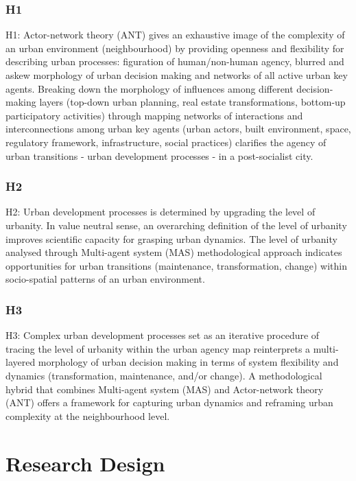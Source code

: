 \documentclass[11pt]{report}
\begin{document}
\subsubsection{H1}

H1: Actor-network theory (ANT) gives an exhaustive image of the complexity of an urban environment (neighbourhood) by providing openness and flexibility for describing urban processes: figuration of human/non-human agency, blurred and askew morphology of urban decision  making and networks of all active urban key agents.
Breaking  down  the morphology of influences among different decision-making layers (top-down urban planning, real estate transformations, bottom-up participatory activities) through mapping networks of interactions and interconnections among urban key agents (urban actors, built environment, space, regulatory framework, infrastructure, 
social practices) clarifies the agency of urban transitions - urban development processes - in a post-socialist city.

\subsubsection{H2}

H2:  Urban development processes  is  determined  by  upgrading the  level  of  urbanity.  In value neutral sense, an overarching definition of the level of urbanity improves scientific capacity for grasping urban dynamics. The level of urbanity analysed through Multi-agent system (MAS) methodological approach indicates opportunities for urban transitions (maintenance, transformation, change) within socio-spatial patterns of an urban environment. 

\subsubsection{H3}

H3: Complex urban development processes set as an iterative procedure of tracing the level of urbanity within the urban agency map reinterprets a multi-layered morphology of urban decision making in terms of system flexibility and dynamics (transformation, maintenance, and/or change). A methodological hybrid that combines Multi-agent system (MAS) and Actor-network theory (ANT) offers a framework for capturing urban dynamics and reframing urban complexity at the neighbourhood level.

\section{Research Design}
\end{document}
